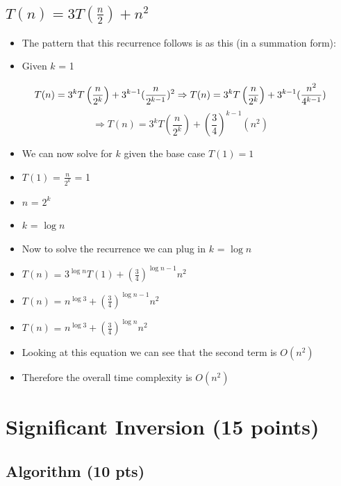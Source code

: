 \documentclass{article}[12pt]
\begin{document}
\vspace*{10px}
\subsection{$T(n) = 3T\left(\frac{n}{2}\right) + n^2$}
\begin{itemize}
  \item The pattern that this recurrence follows is as this (in a summation form):
  \item Given $k$ = 1
\end{itemize}

\begin{equation*}
  T(n) = 3^{k} T\left(\frac{n}{2^{k}}\right) + 3^{k-1} (\frac{n}{2^{k-1}})^{2}
  \Rightarrow
  T(n) = 3^{k} T\left(\frac{n}{2^{k}}\right) + 3^{k-1} (\frac{n^{2}}{4^{k-1}}) \\
\end{equation*}
\begin{equation*}
  \Rightarrow
  T(n) = 3^{k} T\left(\frac{n}{2^{k}}\right) + (\frac{3}{4})^{k-1} (n^{2})
\end{equation*}

\begin{itemize}
  \item We can now solve for $k$ given the base case $T(1) = 1$
  \item $T(1)$ = $\frac{n}{2^{k}}$ = 1
  \item $n$ = $2^{k}$
  \item $k$ = $\log n$
  \item Now to solve the recurrence we can plug in $k$ = $\log n$
  \item $T(n)$ = $3^{\log n} T(1) + (\frac{3}{4})^{\log n - 1} n^{2}$
  \item $T(n)$ = $n^{\log 3} + (\frac{3}{4})^{\log n - 1} n^{2}$
  \item $T(n)$ = $n^{\log 3} + (\frac{3}{4})^{\log n} n^{2}$
  \item Looking at this equation we can see that the second term is $O(n^{2})$
  \item Therefore the overall time complexity is $O(n^{2})$
\end{itemize}

\newpage

\section{Significant Inversion (15 points)}

\subsection{Algorithm (10 pts)}
\end{document}

